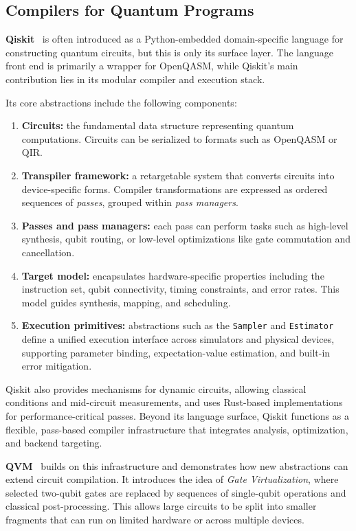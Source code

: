 \subsection{Compilers for Quantum Programs}


\textbf{Qiskit}~\cite{javadiabhari2024quantumcomputingqiskit} is often introduced as a Python-embedded domain-specific language for constructing quantum circuits, but this is only its surface layer. The language front end is primarily a wrapper for OpenQASM, while Qiskit’s main contribution lies in its modular compiler and execution stack. 

Its core abstractions include the following components:

\begin{enumerate}
  \item \textbf{Circuits:} the fundamental data structure representing quantum computations. Circuits can be serialized to formats such as OpenQASM or QIR.
  \item \textbf{Transpiler framework:} a retargetable system that converts circuits into device-specific forms. Compiler transformations are expressed as ordered sequences of \emph{passes}, grouped within \emph{pass managers}.
  \item \textbf{Passes and pass managers:} each pass can perform tasks such as high-level synthesis, qubit routing, or low-level optimizations like gate commutation and cancellation.
  \item \textbf{Target model:} encapsulates hardware-specific properties including the instruction set, qubit connectivity, timing constraints, and error rates. This model guides synthesis, mapping, and scheduling.
  \item \textbf{Execution primitives:} abstractions such as the \texttt{Sampler} and \texttt{Estimator} define a unified execution interface across simulators and physical devices, supporting parameter binding, expectation-value estimation, and built-in error mitigation.
\end{enumerate}


Qiskit also provides mechanisms for dynamic circuits, allowing classical conditions and mid-circuit measurements, and uses Rust-based implementations for performance-critical passes. Beyond its language surface, Qiskit functions as a flexible, pass-based compiler infrastructure that integrates analysis, optimization, and backend targeting.

\textbf{QVM}~\cite{qvm2024} builds on this infrastructure and demonstrates how new abstractions can extend circuit compilation. It introduces the idea of \emph{Gate Virtualization}, where selected two-qubit gates are replaced by sequences of single-qubit operations and classical post-processing. This allows large circuits to be split into smaller fragments that can run on limited hardware or across multiple devices.

